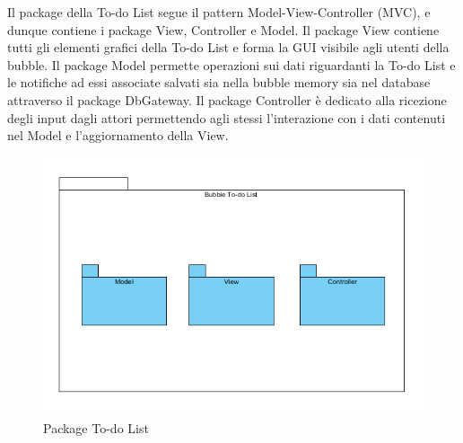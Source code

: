 Il package della To-do List segue il pattern Model-View-Controller (MVC), e dunque contiene i package View, Controller e Model. Il package View contiene tutti gli elementi grafici della To-do List e forma la GUI visibile agli utenti della bubble. Il package Model permette operazioni sui dati riguardanti la To-do List e le notifiche ad essi associate salvati sia nella bubble memory sia nel database attraverso il package Db\-Gateway. Il package Controller è dedicato alla ricezione degli input dagli attori permettendo agli stessi l'interazione con i dati contenuti nel Model e l'aggiornamento della View.

\begin{figure}[H]
	\centering
	\includegraphics[width=14cm]{../../documenti/SpecificaTecnica/diagrammi_img/classi_e_package/todo.png}
	\caption{Package To-do List}
\end{figure}

